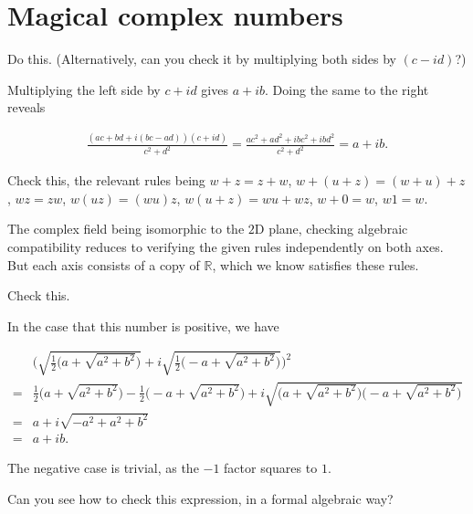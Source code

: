 \documentclass[../the-road-to-reality.tex]{subfiles}
\begin{document}
\section{Magical complex numbers}

\begin{questions}

\question Do this. (Alternatively, can you check it by multiplying both sides by $(c - id)$?)

\begin{solution}
	Multiplying the left side by $c + id$ gives $a + ib$. Doing the same to the right reveals
	
	\begin{align*}
		\frac{(ac + bd + i(bc - ad))(c + id)}{c^2 + d^2} = \frac{ac^2 + ad^2 + ibc^2 + ibd^2}{c^2 + d^2} = a + ib.
	\end{align*}
\end{solution}

\question Check this, the relevant rules being $w + z = z + w$, $w + (u + z) = (w + u) + z$, $wz = zw$, $w(uz) = (wu)z$, $w(u + z) = wu + wz$, $w + 0 = w$, $w1 = w$.

\begin{solution}
	The complex field being isomorphic to the $2$D plane, checking algebraic compatibility reduces to verifying the given rules independently on both axes. But each axis consists of a copy of $\mathbb{R}$, which we know satisfies these rules.
\end{solution}

\question Check this.

\begin{solution}
	In the case that this number is positive, we have

	\begin{align*}
		&\Big(\sqrt{\frac{1}{2}\big(a + \sqrt{a^2 + b^2}\big)} + i\sqrt{\frac{1}{2}\big(-a + \sqrt{a^2 + b^2})}\Big)^2\\
		= &\frac{1}{2}\big(a + \sqrt{a^2 + b^2}\big) - \frac{1}{2}\big(-a + \sqrt{a^2 + b^2}\big) + i\sqrt{\big(a + \sqrt{a^2 + b^2}\big)\big(-a + \sqrt{a^2 + b^2}\big)}\\
		= &a + i\sqrt{-a^2 + a^2 + b^2}\\
		= &a + ib.
	\end{align*}

	The negative case is trivial, as the $-1$ factor squares to $1$.
\end{solution}

\question Can you see how to check this expression, in a formal algebraic way?


\end{questions}
\end{document}
